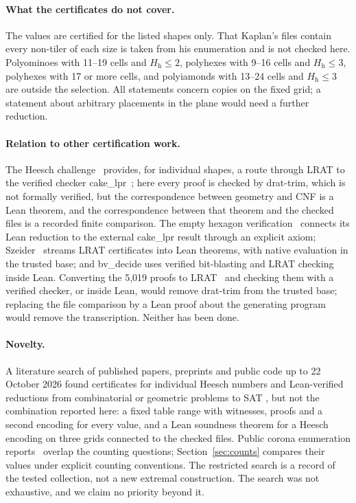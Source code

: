 \documentclass[10pt,a4paper]{article}
\theoremstyle{definition}
\theoremstyle{remark}
\newcommand{\Hh}{H_{\mathrm h}}
\begin{document}
\paragraph{What the certificates do not cover.}
The values are certified for the listed shapes only. That Kaplan's files
contain every non-tiler of each size is taken from his enumeration and is
not checked here. Polyominoes with 11--19 cells and $\Hh\leq2$, polyhexes
with 9--16 cells and $\Hh\leq3$, polyhexes with 17 or more cells, and
polyiamonds with 13--24 cells and $\Hh\leq3$ are outside the selection.
All statements concern copies on the fixed grid; a statement about
arbitrary placements in the plane would need a further reduction.

\paragraph{Relation to other certification work.}
The Heesch challenge~\cite{Layr} provides, for individual shapes, a
route through LRAT to the verified checker cake\_lpr~\cite{cakelpr};
here every proof is checked by drat-trim, which is not formally verified, but the
correspondence between geometry and CNF is a Lean theorem, and the
correspondence between that theorem and the checked files is a recorded
finite comparison. The empty hexagon verification~\cite{EmptyHex}
connects its Lean reduction to the external cake\_lpr result through an
explicit axiom; Szeider~\cite{Szeider} streams LRAT certificates into Lean
theorems, with native evaluation in the trusted base; and bv\_decide
\cite{Boving} uses verified bit-blasting and LRAT checking inside Lean.
Converting the 5,019 proofs to LRAT~\cite{LRAT} and checking them with
a verified checker, or inside Lean, would remove drat-trim from the trusted
base; replacing the file comparison by a Lean proof about the generating
program would remove the transcription. Neither has been done.

\paragraph{Novelty.}
A literature search of published papers, preprints and public code up to
22 October 2026 found certificates for individual Heesch numbers
\cite{Layr} and Lean-verified reductions from combinatorial or geometric
problems to SAT \cite{CAH,Holliday,EmptyHex}, but not the combination
reported here: a fixed table range with witnesses, proofs and a second
encoding for every value, and a Lean soundness theorem for a Heesch
encoding on three grids connected to the checked files. Public corona
enumeration reports~\cite{LayrReports} overlap the counting questions;
Section~\ref{sec:counts} compares their values under explicit counting
conventions. The restricted search is a record of the tested collection,
not a new extremal construction. The search was
not exhaustive, and we claim no priority beyond it.
\end{document}
